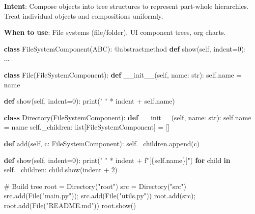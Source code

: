 \documentclass[11pt]{article}
\newenvironment{Shaded}{\begin{snugshade}}{\end{snugshade}}
\newcommand{\AttributeTok}[1]{\textcolor[rgb]{0.16,0.50,0.73}{#1}}
\newcommand{\BuiltInTok}[1]{\textcolor[rgb]{0.50,0.55,0.55}{#1}}
\newcommand{\CommentTok}[1]{\textcolor[rgb]{0.48,0.49,0.49}{#1}}
\newcommand{\ControlFlowTok}[1]{\textcolor[rgb]{0.99,0.74,0.29}{\textbf{#1}}}
\newcommand{\DecValTok}[1]{\textcolor[rgb]{0.96,0.45,0.00}{#1}}
\newcommand{\FunctionTok}[1]{\textcolor[rgb]{0.56,0.27,0.68}{#1}}
\newcommand{\KeywordTok}[1]{\textcolor[rgb]{0.81,0.81,0.76}{\textbf{#1}}}
\newcommand{\NormalTok}[1]{\textcolor[rgb]{0.81,0.81,0.76}{#1}}
\newcommand{\OperatorTok}[1]{\textcolor[rgb]{0.81,0.81,0.76}{#1}}
\newcommand{\SpecialCharTok}[1]{\textcolor[rgb]{0.24,0.68,0.91}{#1}}
\newcommand{\SpecialStringTok}[1]{\textcolor[rgb]{0.85,0.27,0.33}{#1}}
\newcommand{\StringTok}[1]{\textcolor[rgb]{0.96,0.31,0.31}{#1}}
\newcommand{\VariableTok}[1]{\textcolor[rgb]{0.15,0.68,0.68}{#1}}
\begin{document}
\textbf{Intent}: Compose objects into tree structures to represent part-whole hierarchies. Treat individual objects and compositions uniformly.

\textbf{When to use}: File systems (file/folder), UI component trees, org charts.


\begin{Shaded}
\begin{Highlighting}[]
\KeywordTok{class}\NormalTok{ FileSystemComponent(ABC):}
    \AttributeTok{@abstractmethod}
    \KeywordTok{def}\NormalTok{ show(}\VariableTok{self}\NormalTok{, indent}\OperatorTok{=}\DecValTok{0}\NormalTok{): ...}

\KeywordTok{class}\NormalTok{ File(FileSystemComponent):}
    \KeywordTok{def} \FunctionTok{\_\_init\_\_}\NormalTok{(}\VariableTok{self}\NormalTok{, name: }\BuiltInTok{str}\NormalTok{):}
        \VariableTok{self}\NormalTok{.name }\OperatorTok{=}\NormalTok{ name}

    \KeywordTok{def}\NormalTok{ show(}\VariableTok{self}\NormalTok{, indent}\OperatorTok{=}\DecValTok{0}\NormalTok{):}
        \BuiltInTok{print}\NormalTok{(}\StringTok{" "} \OperatorTok{*}\NormalTok{ indent }\OperatorTok{+} \VariableTok{self}\NormalTok{.name)}

\KeywordTok{class}\NormalTok{ Directory(FileSystemComponent):}
    \KeywordTok{def} \FunctionTok{\_\_init\_\_}\NormalTok{(}\VariableTok{self}\NormalTok{, name: }\BuiltInTok{str}\NormalTok{):}
        \VariableTok{self}\NormalTok{.name }\OperatorTok{=}\NormalTok{ name}
        \VariableTok{self}\NormalTok{.\_children: }\BuiltInTok{list}\NormalTok{[FileSystemComponent] }\OperatorTok{=}\NormalTok{ []}

    \KeywordTok{def}\NormalTok{ add(}\VariableTok{self}\NormalTok{, c: FileSystemComponent):}
        \VariableTok{self}\NormalTok{.\_children.append(c)}

    \KeywordTok{def}\NormalTok{ show(}\VariableTok{self}\NormalTok{, indent}\OperatorTok{=}\DecValTok{0}\NormalTok{):}
        \BuiltInTok{print}\NormalTok{(}\StringTok{" "} \OperatorTok{*}\NormalTok{ indent }\OperatorTok{+} \SpecialStringTok{f"[}\SpecialCharTok{\{}\VariableTok{self}\SpecialCharTok{.}\NormalTok{name}\SpecialCharTok{\}}\SpecialStringTok{]"}\NormalTok{)}
        \ControlFlowTok{for}\NormalTok{ child }\KeywordTok{in} \VariableTok{self}\NormalTok{.\_children:}
\NormalTok{            child.show(indent }\OperatorTok{+} \DecValTok{2}\NormalTok{)}

\CommentTok{\# Build tree}
\NormalTok{root }\OperatorTok{=}\NormalTok{ Directory(}\StringTok{"root"}\NormalTok{)}
\NormalTok{src }\OperatorTok{=}\NormalTok{ Directory(}\StringTok{"src"}\NormalTok{)}
\NormalTok{src.add(File(}\StringTok{"main.py"}\NormalTok{))}\OperatorTok{;}\NormalTok{ src.add(File(}\StringTok{"utils.py"}\NormalTok{))}
\NormalTok{root.add(src)}\OperatorTok{;}\NormalTok{ root.add(File(}\StringTok{"README.md"}\NormalTok{))}
\NormalTok{root.show()}
\end{Highlighting}
\end{Shaded}
\end{document}
